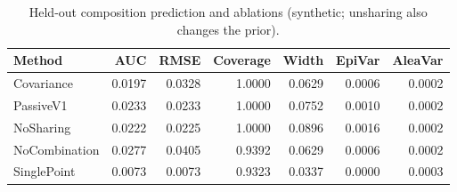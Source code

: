 \begin{table}[t]
\caption{Held-out composition prediction and ablations (synthetic; unsharing also changes the prior).}
\label{tab:experiment3}
\begin{tabular}{lrrrrrr}
\toprule
Method & AUC & RMSE & Coverage & Width & EpiVar & AleaVar \\
\midrule
Covariance & 0.0197 & 0.0328 & 1.0000 & 0.0629 & 0.0006 & 0.0002 \\
PassiveV1 & 0.0233 & 0.0233 & 1.0000 & 0.0752 & 0.0010 & 0.0002 \\
NoSharing & 0.0222 & 0.0225 & 1.0000 & 0.0896 & 0.0016 & 0.0002 \\
NoCombination & 0.0277 & 0.0405 & 0.9392 & 0.0629 & 0.0006 & 0.0002 \\
SinglePoint & 0.0073 & 0.0073 & 0.9323 & 0.0337 & 0.0000 & 0.0003 \\
\bottomrule
\end{tabular}
\end{table}
